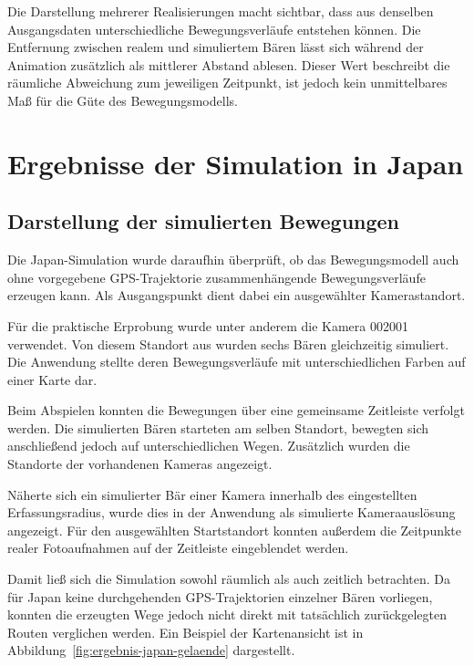 \documentclass[12pt,a4paper]{report}
\begin{document}
Die Darstellung mehrerer Realisierungen macht
sichtbar, dass aus denselben Ausgangsdaten
unterschiedliche Bewegungsverläufe entstehen
können. Die Entfernung zwischen realem und
simuliertem Bären lässt sich während der
Animation zusätzlich als mittlerer Abstand
ablesen. Dieser Wert beschreibt die räumliche
Abweichung zum jeweiligen Zeitpunkt, ist jedoch
kein unmittelbares Maß für die Güte des
Bewegungsmodells.



\section{Ergebnisse der Simulation in Japan}
\label{sec:ergebnisse-japan}

\subsection{Darstellung der simulierten Bewegungen}

Die Japan-Simulation wurde daraufhin überprüft,
ob das Bewegungsmodell auch ohne vorgegebene
GPS-Trajektorie zusammenhängende Bewegungsverläufe
erzeugen kann. Als Ausgangspunkt dient dabei
ein ausgewählter Kamerastandort.

Für die praktische Erprobung wurde unter anderem
die Kamera 002001 verwendet. Von diesem Standort
aus wurden sechs Bären gleichzeitig simuliert.
Die Anwendung stellte deren Bewegungsverläufe
mit unterschiedlichen Farben auf einer Karte dar.

Beim Abspielen konnten die Bewegungen über eine
gemeinsame Zeitleiste verfolgt werden. Die
simulierten Bären starteten am selben Standort,
bewegten sich anschließend jedoch auf
unterschiedlichen Wegen. Zusätzlich wurden die
Standorte der vorhandenen Kameras angezeigt.

Näherte sich ein simulierter Bär einer Kamera
innerhalb des eingestellten Erfassungsradius,
wurde dies in der Anwendung als simulierte
Kameraauslösung angezeigt. Für den ausgewählten
Startstandort konnten außerdem die Zeitpunkte
realer Fotoaufnahmen auf der Zeitleiste
eingeblendet werden.

Damit ließ sich die Simulation sowohl räumlich
als auch zeitlich betrachten. Da für Japan keine
durchgehenden GPS-Trajektorien einzelner Bären
vorliegen, konnten die erzeugten Wege jedoch
nicht direkt mit tatsächlich zurückgelegten
Routen verglichen werden.
Ein Beispiel der Kartenansicht ist in
Abbildung~\ref{fig:ergebnis-japan-gelaende}
dargestellt.
\end{document}
